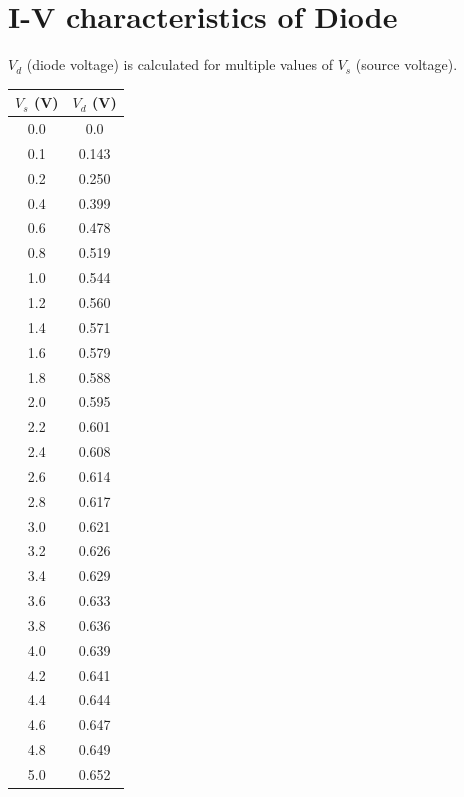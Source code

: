 \documentclass[12pt,a4paper]{report}
\begin{document}
\section{I-V characteristics of Diode}
$V_d$ (diode voltage) is calculated for multiple values of $V_s$ (source voltage).
\begin{figure}[!ht]
\centering
{}%
\end{figure}
\pagebreak
\begin{table}[h!]
\centering
\begin{tabular}{|c|c|}
\hline
$V_s$ (V) & $V_d$ (V) \\
\hline
0.0 & 0.0 \\
0.1 & 0.143 \\
0.2 & 0.250 \\
0.4 & 0.399 \\
0.6 & 0.478 \\
0.8 & 0.519 \\
1.0 & 0.544 \\
1.2 & 0.560 \\
1.4 & 0.571 \\
1.6 & 0.579 \\
1.8 & 0.588 \\
2.0 & 0.595 \\
2.2 & 0.601 \\
2.4 & 0.608 \\
2.6 & 0.614 \\
2.8 & 0.617 \\
3.0 & 0.621 \\
3.2 & 0.626 \\
3.4 & 0.629 \\
3.6 & 0.633 \\
3.8 & 0.636 \\
4.0 & 0.639 \\
4.2 & 0.641 \\
4.4 & 0.644 \\
4.6 & 0.647 \\
4.8 & 0.649 \\
5.0 & 0.652 \\
\hline
\end{tabular}
\end{table}
\end{document}
